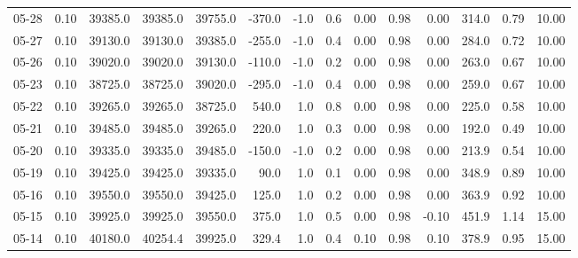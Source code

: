 \begin{threeparttable}
{\begin{tabular}{lrrrrrrrrrrrrr}
  05-28 &     0.10 & 39385.0 & 39385.0 & 39755.0 &     -370.0 &                     -1.0 &                 0.6 &       0.00 &      0.98 &           0.00 &            314.0 &            0.79 &                  10.00 \\
  05-27 &     0.10 & 39130.0 & 39130.0 & 39385.0 &     -255.0 &                     -1.0 &                 0.4 &       0.00 &      0.98 &           0.00 &            284.0 &            0.72 &                  10.00 \\
  05-26 &     0.10 & 39020.0 & 39020.0 & 39130.0 &     -110.0 &                     -1.0 &                 0.2 &       0.00 &      0.98 &           0.00 &            263.0 &            0.67 &                  10.00 \\
  05-23 &     0.10 & 38725.0 & 38725.0 & 39020.0 &     -295.0 &                     -1.0 &                 0.4 &       0.00 &      0.98 &           0.00 &            259.0 &            0.67 &                  10.00 \\
  05-22 &     0.10 & 39265.0 & 39265.0 & 38725.0 &      540.0 &                      1.0 &                 0.8 &       0.00 &      0.98 &           0.00 &            225.0 &            0.58 &                  10.00 \\
  05-21 &     0.10 & 39485.0 & 39485.0 & 39265.0 &      220.0 &                      1.0 &                 0.3 &       0.00 &      0.98 &           0.00 &            192.0 &            0.49 &                  10.00 \\
  05-20 &     0.10 & 39335.0 & 39335.0 & 39485.0 &     -150.0 &                     -1.0 &                 0.2 &       0.00 &      0.98 &           0.00 &            213.9 &            0.54 &                  10.00 \\
  05-19 &     0.10 & 39425.0 & 39425.0 & 39335.0 &       90.0 &                      1.0 &                 0.1 &       0.00 &      0.98 &           0.00 &            348.9 &            0.89 &                  10.00 \\
  05-16 &     0.10 & 39550.0 & 39550.0 & 39425.0 &      125.0 &                      1.0 &                 0.2 &       0.00 &      0.98 &           0.00 &            363.9 &            0.92 &                  10.00 \\
  05-15 &     0.10 & 39925.0 & 39925.0 & 39550.0 &      375.0 &                      1.0 &                 0.5 &       0.00 &      0.98 &          -0.10 &            451.9 &            1.14 &                  15.00 \\
  05-14 &     0.10 & 40180.0 & 40254.4 & 39925.0 &      329.4 &                      1.0 &                 0.4 &       0.10 &      0.98 &           0.10 &            378.9 &            0.95 &                  15.00 \\

\end{tabular}}
\end{threeparttable}
